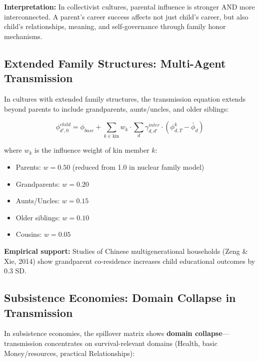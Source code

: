 \textbf{Interpretation:} In collectivist cultures, parental influence is stronger AND more
interconnected. A parent's career success affects not just child's career, but also child's
relationships, meaning, and self-governance through family honor mechanisms.

\subsection{Extended Family Structures: Multi-Agent Transmission}

In cultures with extended family structures, the transmission equation extends beyond
parents to include grandparents, aunts/uncles, and older siblings:

\begin{equation}
\phi^{child}_{d',0} = \phi_{base} + \sum_{k \in \text{kin}} w_k \cdot \sum_{d} \gamma^{inter}_{d,d'} \cdot (\phi^{k}_{d,T} - \bar{\phi}_d)
\end{equation}

where $w_k$ is the influence weight of kin member $k$:
\begin{itemize}[nosep]
\item Parents: $w = 0.50$ (reduced from 1.0 in nuclear family model)
\item Grandparents: $w = 0.20$
\item Aunts/Uncles: $w = 0.15$
\item Older siblings: $w = 0.10$
\item Cousins: $w = 0.05$
\end{itemize}

\textbf{Empirical support:} Studies of Chinese multigenerational households (Zeng \& Xie, 2014)
show grandparent co-residence increases child educational outcomes by 0.3 SD.

\subsection{Subsistence Economies: Domain Collapse in Transmission}

In subsistence economies, the spillover matrix shows \textbf{domain collapse}---transmission
concentrates on survival-relevant domains (Health, basic Money/resources, practical Relationships):

